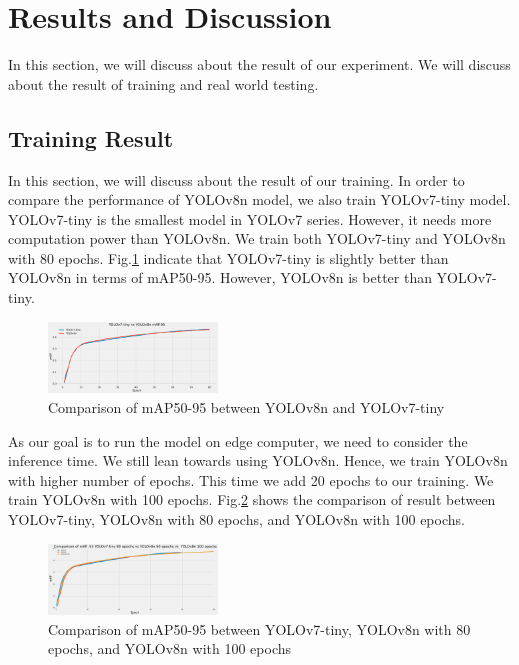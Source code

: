 \documentclass[conference]{IEEEtran}
\begin{document}
\section{Results and Discussion}
In this section, we will discuss about the result of our experiment. We will discuss about the result of training and real world testing.
\subsection{Training Result}
In this section, we will discuss about the result of our training. In order to compare the performance of YOLOv8n model, we also train YOLOv7-tiny model.
YOLOv7-tiny is the smallest model in YOLOv7 series. However, it needs more computation power than YOLOv8n. We train both YOLOv7-tiny and YOLOv8n with 80 epochs.
Fig.\ref{fig:mAP_comparison} indicate that YOLOv7-tiny is slightly better than YOLOv8n in terms of mAP50-95. However, YOLOv8n is better than YOLOv7-tiny.
\begin{figure}[h]
\centering
\includegraphics[width=0.4\textwidth,keepaspectratio]{YOLOv7-tinyvsYOLOv8n.png}
\caption{Comparison of mAP50-95 between YOLOv8n and YOLOv7-tiny}
\label{fig:mAP_comparison}
\end{figure}


As our goal is to run the model on edge computer, we need to consider the inference time. We still lean towards using YOLOv8n. Hence, we train YOLOv8n with higher number of epochs.
This time we add 20 epochs to our training. We train YOLOv8n with 100 epochs. Fig.\ref{fig:YOLOv7vsYOLOv8,80,100} shows the comparison of result between YOLOv7-tiny, YOLOv8n with 80 epochs, and YOLOv8n with 100 epochs.
\begin{figure}[h!]
\centering
\includegraphics[width=0.4\textwidth,keepaspectratio]{YOLOv7vs YOLOv8,80,100.png}
\caption{Comparison of mAP50-95 between YOLOv7-tiny, YOLOv8n with 80 epochs, and YOLOv8n with 100 epochs}
\label{fig:YOLOv7vsYOLOv8,80,100}
\end{figure}
\end{document}
